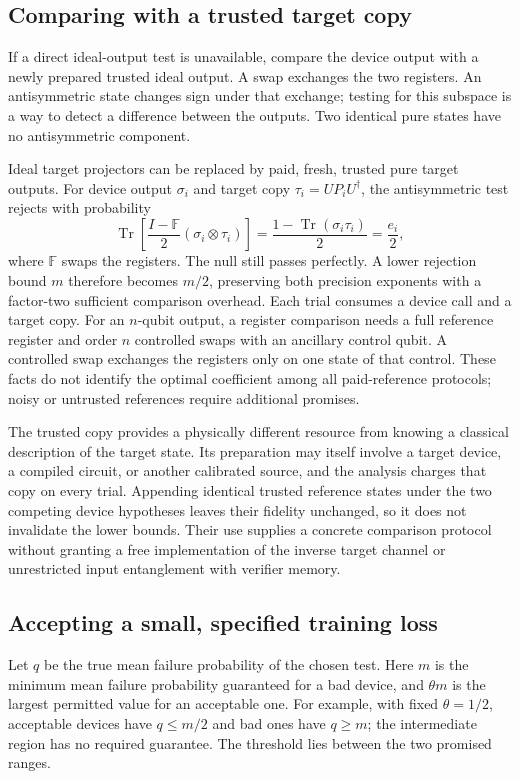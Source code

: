 \documentclass[11pt,a4paper]{article}
\newcommand{\Tr}{\operatorname{Tr}}
\numberwithin{equation}{section}
\begin{document}
\subsection{Comparing with a trusted target copy}

If a direct ideal-output test is unavailable, compare the device output
with a newly prepared trusted ideal output. A swap exchanges the two
registers. An antisymmetric state changes sign under that exchange; testing
for this subspace is a way to detect a difference between the outputs.
Two identical pure states have no antisymmetric component.

Ideal target projectors can be replaced by paid, fresh, trusted pure target outputs. For device output $\sigma_i$ and target copy $\tau_i=UP_iU^\dagger$, the antisymmetric test rejects with probability
\[
 \Tr\!\left[\frac{I-\mathbb F}{2}(\sigma_i\otimes\tau_i)\right]
 =\frac{1-\Tr(\sigma_i\tau_i)}2=\frac{e_i}{2},
\]
where $\mathbb F$ swaps the registers. The null still passes perfectly. A lower rejection bound $m$ therefore becomes $m/2$, preserving both precision exponents with a factor-two sufficient comparison overhead. Each trial consumes a device call and a target copy. For an $n$-qubit output, a register comparison needs a full reference register and order $n$ controlled swaps with an ancillary control qubit. A controlled swap exchanges the registers only on one state of that control. These facts do not identify the optimal coefficient among all paid-reference protocols; noisy or untrusted references require additional promises.

The trusted copy provides a physically different resource from knowing a classical description of the target state. Its preparation may itself involve a target device, a compiled circuit, or another calibrated source, and the analysis charges that copy on every trial. Appending identical trusted reference states under the two competing device hypotheses leaves their fidelity unchanged, so it does not invalidate the lower bounds. Their use supplies a concrete comparison protocol without granting a free implementation of the inverse target channel or unrestricted input entanglement with verifier memory.

\subsection{Accepting a small, specified training loss}

Let $q$ be the true mean failure probability of the chosen test. Here $m$ is the minimum mean failure probability guaranteed for a bad
device, and $\theta m$ is the largest permitted value for an acceptable one.
For example, with fixed $\theta=1/2$, acceptable devices have $q\le m/2$
and bad ones have $q\ge m$; the intermediate region has no required
guarantee. The threshold lies between the two promised ranges.
\end{document}
